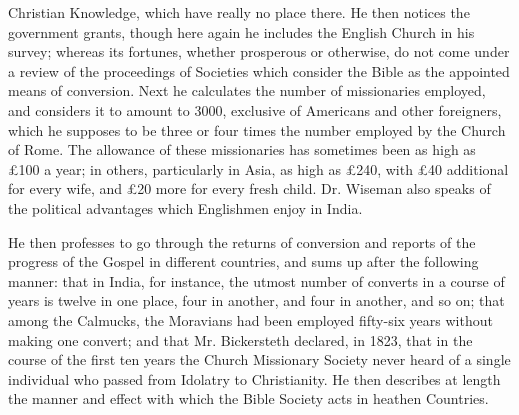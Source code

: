 Christian Knowledge, which have really no place there. He then notices
the government grants, though here again he includes the English Church
in his survey; whereas its fortunes, whether prosperous or otherwise, do
not come under a review of the proceedings of Societies which consider
the Bible as the appointed means of conversion. Next he calculates the
number of missionaries employed, and considers it to amount to 3000,
exclusive of Americans and other foreigners, which he supposes to be
three or four times the number employed by the Church of Rome. The
allowance of these missionaries has sometimes been as high as £100 a
year; in others, particularly in Asia, as high as £240, with £40
additional for every wife, and £20 more for every fresh child. Dr.
Wiseman also speaks of the political advantages which Englishmen enjoy
in India.

He then
professes to go through the returns of conversion and reports of the
progress of the Gospel in different countries, and sums up after the
following manner: that in India, for instance, the utmost number of
converts in a course of years is twelve in one place, four in another,
and four in another, and so on; that among the Calmucks, the Moravians
had been employed fifty-six years
without making one convert; and that Mr. Bickersteth declared, in 1823,
that in the course of the first ten years the Church Missionary Society
never heard of a single individual who passed from Idolatry to
Christianity. He then describes at length the manner and effect with
which the Bible Society acts in heathen Countries.

